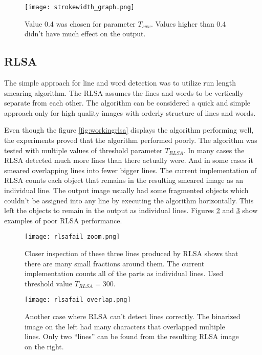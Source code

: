 \documentclass{article}
\begin{document}
      \begin{figure}[!ht]
        \centering
        \texttt{[image: strokewidth\_graph.png]}
        \caption{Value 0.4 was chosen for parameter $T_{swv}$. Values higher than 0.4 didn't have much effect on the output. \label{fig:strokewidthresults}}
      \end{figure}

    \subsection{RLSA}
      The simple approach for line and word detection was to utilize run length smearing algorithm. The RLSA assumes the lines and words to be vertically separate from each other. The algorithm can be considered a quick and simple approach only for high quality images with orderly structure of lines and words.

      Even though the figure \ref{fig:workingrlsa} displays the algorithm performing well, the experiments proved that the algorithm performed poorly. The algorithm was tested with multiple values of threshold parameter $T_{RLSA}$. In many cases the RLSA detected much more lines than there actually were. And in some cases it smeared overlapping lines into fewer bigger lines. The current implementation of RLSA counts each object that remains in the resulting smeared image as an individual line. The output image usually had some fragmented objects which couldn't be assigned into any line by executing the algorithm horizontally. This left the objects to remain in the output as individual lines. Figures \ref{fig:rlsafailzoom} and \ref{fig:rlsafailoverlap} show examples of poor RLSA performance.

      \begin{figure}[!ht]
        \centering
        \texttt{[image: rlsafail\_zoom.png]}
        \caption{Closer inspection of these three lines produced by RLSA shows that there are many small fractions around them. The current implementation counts all of the parts as individual lines. Used threshold value $T_{RLSA} = 300$.  \label{fig:rlsafailzoom}}
      \end{figure}

      \begin{figure}[!ht]
        \centering
        \texttt{[image: rlsafail\_overlap.png]}
        \caption{Another case where RLSA can't detect lines correctly. The binarized image on the left had many characters that overlapped multiple lines. Only two ``lines'' can be found from the resulting RLSA image on the right.  \label{fig:rlsafailoverlap}}
      \end{figure}
\end{document}
